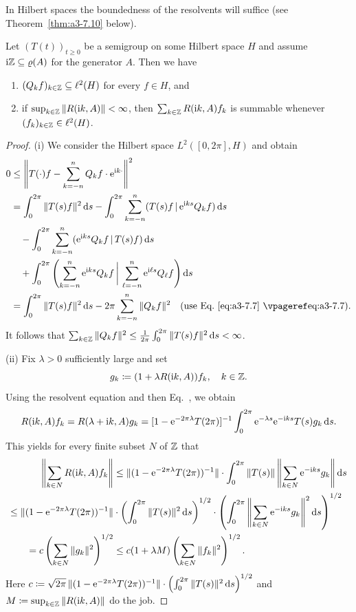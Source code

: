 In Hilbert spaces the boundedness of the resolvents will suffice (see Theorem~\ref{thm:a3-7.10} below).
\begin{lemma}\label{lem:a3-7.9}
Let $(T(t))_{t\geq 0}$ be a semigroup on some Hilbert space $H$ and assume $\im\Z \subseteq \rho(A)$ for the generator $A$.
Then we have
\begin{enumerate}[\upshape (i)]
\item 
$(Q_{k}f)_{k\in\mathbb{Z}} \subseteq \ell^{2}(H)$ for every $f \in H$, and

\item 
if $\sup_{k\in\mathbb{Z}}\|R(\mathrm{i} k,A)\| < \infty$, then $\sum_{k\in\mathbb{Z}} R(\mathrm{i} k,A)f_{k}$ is summable
whenever $(f_{k})_{k\in\mathbb{Z}} \in \ell^{2}(H)$. 
\end{enumerate}
\end{lemma}
\begin{proof}
(i) We consider the Hilbert space $L^{2}([0,2\pi],H)$ and obtain
\begin{align*}
0 &\leq \left\|T(\cdot)f - \sum_{k=-n}^{n} Q_{k}f\cdot \eu^{\im k\cdot}\right\|^{2} \\
&= \int_{0}^{2\pi} \|T(s)f\|^{2} \ds 
   - \int_{0}^{2\pi} \sum_{k=-n}^{n} (T(s)f \,\vert\, \eu^{\im ks}Q_{k}f) \ds \\
&\quad - \int_{0}^{2\pi} \sum_{k=-n}^{n} (\eu^{\im ks}Q_{k}f  \,\vert\, T(s)f) \ds \\
&\quad + \int_{0}^{2\pi} \left(\sum_{k=-n}^{n} \eu^{\im ks}Q_{k}f
        \,\bigg\vert\,  \sum_{\ell=-n}^{n} \eu^{\im \ell s}Q_{\ell}f\right) \ds \\
&= \int_{0}^{2\pi} \|T(s)f\|^{2} \ds - 2\pi\sum_{k=-n}^{n} \|Q_{k}f\|^{2}
   \quad \text{(use Eq.~\myeqpageref{eq:a3-7.7})}.
\end{align*}
It follows that $\sum_{k\in\Z} \|Q_{k}f\|^{2} \leq \frac{1}{2\pi}\int_{0}^{2\pi} \|T(s)f\|^{2} \ds < \infty$.

(ii) Fix $\lambda > 0$ sufficiently large and set 
\[
g_{k}\coloneq (1 + \lambda R(\mathrm{i} k,A))f_{k}, \quad k \in \mathbb{Z} .
\]
Using the resolvent equation and then Eq.~, we obtain
\[
R(\mathrm{i} k,A)f_{k} = R(\lambda + \mathrm{i} k,A)g_{k} = [1 - \mathrm{e}^{-2\pi\lambda}T(2\pi)]^{-1}\int_{0}^{2\pi} \mathrm{e}^{-\lambda s}\mathrm{e}^{-\mathrm{i} ks}T(s)g_{k} \mathop{}\!\mathrm{d}{s} .
\]
This yields for every finite subset $N$ of\/ $\mathbb{Z}$ that
\begin{align*}
	\left\|\sum_{k\in N} R(\im k,A)f_{k}\right\| & 
		\leq \|(1 - \eu^{-2\pi\lambda}T(2\pi))^{-1}\|\cdot\int_{0}^{2\pi} \|T(s)\| 
			\left\|\sum_{k\in N} \eu^{-\im ks}g_{k}\right\| \ds
\\
	\leq \|(1 - \eu^{-2\pi\lambda}T(2\pi))^{-1}\| & \cdot 
	\left(\int_{0}^{2\pi}\|T(s)\|^{2} \ds\right)^{1/2} \cdot \left(\int_{0}^{2\pi}\left\|\sum_{k\in N} 
	\eu^{-\im ks}g_{k}\right\|^{2} \ds \right)^{1/2}
\\
	= c\left(\sum_{k\in N} \|g_{k}\|^{2}\right)^{1/2} & \leq c(1 + \lambda M)\left(\sum_{k\in N} \|f_{k}\|^{2}\right)^{1/2} .
\end{align*}
Here $c\coloneq \sqrt{2\pi}\,\|(1 - \mathrm{e}^{-2\pi\lambda}T(2\pi))^{-1}\|\cdot\left(\int_{0}^{2\pi}\|T(s)\|^{2} \mathop{}\!\mathrm{d}{s}\right)^{1/2}$ and $M\coloneq \sup_{k\in\mathbb{Z}}\|R(\mathrm{i} k,A)\|$ do the job.
\end{proof}
